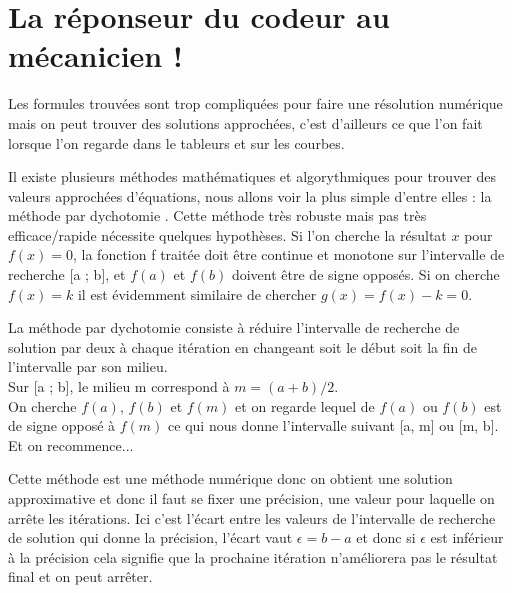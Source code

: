 \documentclass[french,a4paper,10pt]{article}
\begin{document}
\section{La réponseur du codeur au mécanicien !}
Les formules trouvées sont trop compliquées pour faire une résolution numérique mais on peut trouver des solutions approchées, c'est d'ailleurs ce que l'on fait lorsque l'on regarde dans le tableurs et sur les courbes.

Il existe plusieurs méthodes mathématiques et algorythmiques pour trouver des valeurs approchées d'équations, nous allons voir la plus simple d'entre elles : la méthode par \og dychotomie \fg{}. Cette méthode très robuste mais pas très efficace/rapide nécessite quelques hypothèses. Si l'on cherche la résultat $x$ pour $f(x) = 0$, la fonction f traitée doit être continue et monotone sur l'intervalle de recherche [a ; b], et $f(a)$ et $f(b)$ doivent être de signe opposés. Si on cherche $f(x) = k$ il est évidemment similaire de chercher $g(x) = f(x) -k = 0$.

La méthode par dychotomie consiste à réduire l'intervalle de recherche de solution par deux à chaque itération en changeant soit le début soit la fin de l'intervalle par son milieu.\\
Sur [a ; b], le milieu m correspond à $m = (a+b)/2$.\\
On cherche $f(a)$, $f(b)$ et $f(m)$ et on regarde lequel de $f(a)$ ou $f(b)$ est de signe opposé à $f(m)$ ce qui nous donne l'intervalle suivant [a, m] ou [m, b]. Et on recommence...

Cette méthode est une méthode numérique donc on obtient une solution approximative et donc il faut se fixer une précision, une valeur pour laquelle on arrête les itérations. Ici c'est l'écart entre les valeurs de l'intervalle de recherche de solution qui donne la précision, l'écart vaut $\epsilon = b - a$ et donc si $\epsilon$ est inférieur à la précision cela signifie que la prochaine itération n'améliorera pas le résultat final et on peut arrêter.
\end{document}
